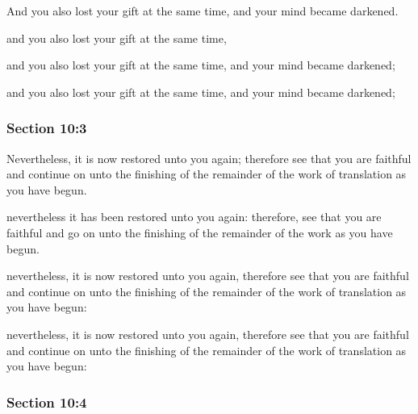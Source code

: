 		And you also lost your gift at the same time, and your mind became darkened.

		\begin{framed}
		\scriptsize
			\begin{compactdesc}
				\item[JSP] and you also lost your gift at the same time,
				\item[RB1] [\textit{missing}] 
				\item[DC 1835] and you also lost your gift at the same time, and your mind became darkened;
				\item[DC 1844] and you also lost your gift at the same time, and your mind became darkened; 
			\end{compactdesc}
		\end{framed}

	\subsubsection{Section 10:3} %
		\label{DC10-3}

		Nevertheless, it is now restored unto you again; therefore see that you are faithful and continue on unto the finishing of the remainder of the work of translation as you have begun.

		\begin{framed}
		\scriptsize
			\begin{compactdesc}
				\item[JSP] nevertheless it has been restored unto you again: therefore, see that you are faithful and go on unto the finishing of the remainder of the work as you have begun.
				\item[RB1] [\textit{missing}] 
				\item[DC 1835] nevertheless, it is now restored unto you again, therefore see that you are faithful and continue on unto the finishing of the remainder of the work of translation as you have begun:
				\item[DC 1844] nevertheless, it is now restored unto you again, therefore see that you are faithful and continue on unto the finishing of the remainder of the work of translation as you have begun:
			\end{compactdesc}
		\end{framed}

	\subsubsection{Section 10:4} %
		\label{DC10-4}

